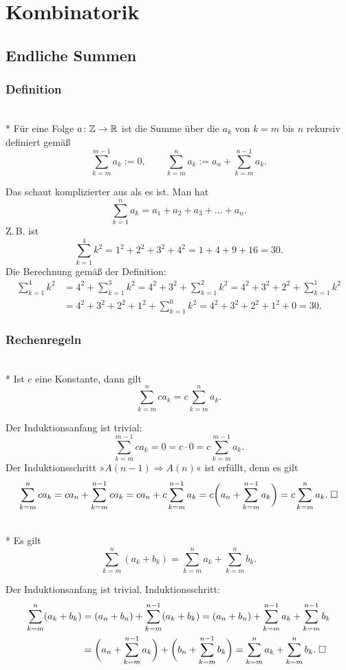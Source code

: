 
\chapter{Kombinatorik}

\section{Endliche Summen}
\subsection{Definition}

\begin{Definition}[Summe]\mbox{}\\*
Für eine Folge $a\colon\mathbb Z\to\mathbb R$ ist die Summe über die $a_k$
von $k=m$ bis $n$ rekursiv definiert gemäß%
\[
\sum_{k=m}^{m-1} a_k := 0,\qquad
\sum_{k=m}^n a_k := a_n+\sum_{k=m}^{n-1} a_k.
\]
\end{Definition}
Das schaut komplizierter aus als es ist. Man hat
\[\sum_{k=1}^n a_k = a_1+a_2+a_3+\ldots+a_n.\]
Z.\,B. ist
\[\sum_{k=1}^4 k^2 = 1^2+2^2+3^2+4^2 = 1+4+9+16 = 30.\]
Die Berechnung gemäß der Definition:
\begin{align*}
\sum_{k=1}^4 k^2 &= 4^2+\sum_{k=1}^3 k^2
= 4^2+3^2+\sum_{k=1}^2 k^2
= 4^2+3^2+2^2+\sum_{k=1}^1 k^2\\
&= 4^2+3^2+2^2+1^2+\sum_{k=1}^{0} k^2 = 4^2+3^2+2^2+1^2+0 = 30.
\end{align*}

\subsection{Rechenregeln}
\begin{Satz}%
\label{Summe-Hom}\mbox{}\\*
Ist $c$ eine Konstante, dann gilt
\[\sum_{k=m}^n ca_k = c\sum_{k=m}^n a_k.\]
\end{Satz}
Der Induktionsanfang ist trivial:
\[\sum_{k=m}^{m-1} ca_k = 0 = c\cdot 0 = c\sum_{k=m}^{m-1} a_k.\]
Der Induktionsschritt »$A(n-1)\Rightarrow A(n)$« ist erfüllt, denn es gilt
\[\sum_{k=m}^n ca_k = ca_n+\sum_{k=m}^{n-1} ca_k = ca_n+c\sum_{k=m}^{n-1} a_k
= c\bigg(a_n+\sum_{k=m}^{n-1} a_k\bigg) = c\sum_{k=m}^n a_k.\;\Box\]

\begin{Satz}%
\label{Summe-Add}\mbox{}\\*
Es gilt
\[\sum_{k=m}^n (a_k+b_k) = \sum_{k=m}^n a_k+\sum_{k=m}^n b_k.\]
\end{Satz}
Der Induktionsanfang ist trivial. Induktionsschritt:
\begin{align*}
\sum_{k=m}^n (a_k+b_k) &= (a_n+b_n)+\sum_{k=m}^{n-1} (a_k+b_k)
= (a_n+b_n)+\sum_{k=m}^{n-1} a_k+\sum_{k=m}^{n-1} b_k\\
&= \bigg(a_n+\sum_{k=m}^{n-1}a_k\bigg)+\bigg(b_n+\sum_{k=m}^{n-1}b_k\bigg)
= \sum_{k=m}^n a_k+\sum_{k=m}^n b_k.\;\Box
\end{align*}

